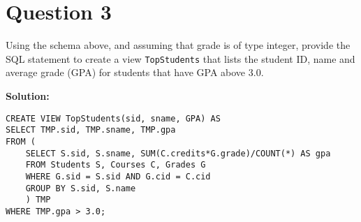 
\section*{Question 3}

Using the schema above, and assuming that grade is of type integer, provide the SQL statement to create a view \texttt{TopStudents} that lists the student ID, name and average grade (GPA) for students that have GPA above 3.0.

\textbf{Solution:}

\lstset{language=SQL}
\lstset{numbers=none}
\begin{lstlisting}
CREATE VIEW TopStudents(sid, sname, GPA) AS
SELECT TMP.sid, TMP.sname, TMP.gpa
FROM (
	SELECT S.sid, S.sname, SUM(C.credits*G.grade)/COUNT(*) AS gpa
	FROM Students S, Courses C, Grades G
	WHERE G.sid = S.sid AND G.cid = C.cid
	GROUP BY S.sid, S.name
	) TMP
WHERE TMP.gpa > 3.0;
\end{lstlisting}
